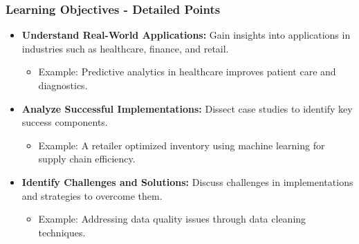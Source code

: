 \documentclass{beamer}
\begin{document}
\begin{frame}[fragile]
    \frametitle{Learning Objectives - Detailed Points}
    \begin{itemize}
        \item \textbf{Understand Real-World Applications:} 
        Gain insights into applications in industries such as healthcare, finance, and retail.
        \begin{itemize}
            \item Example: Predictive analytics in healthcare improves patient care and diagnostics.
        \end{itemize}
        
        \item \textbf{Analyze Successful Implementations:} 
        Dissect case studies to identify key success components.
        \begin{itemize}
            \item Example: A retailer optimized inventory using machine learning for supply chain efficiency.
        \end{itemize}
        
        \item \textbf{Identify Challenges and Solutions:} 
        Discuss challenges in implementations and strategies to overcome them.
        \begin{itemize}
            \item Example: Addressing data quality issues through data cleaning techniques.
        \end{itemize}
    \end{itemize}
\end{frame}
\end{document}
